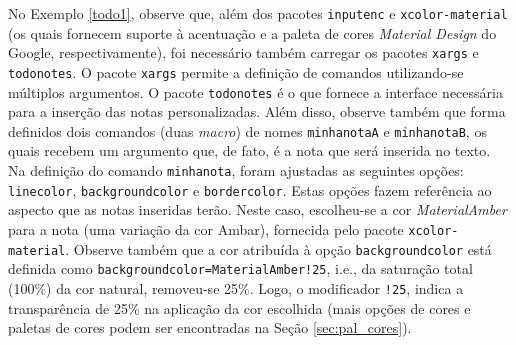 
No Exemplo \ref{todo1}, observe que, além dos pacotes {\tt inputenc} e {\tt xcolor-material} (os quais fornecem suporte à acentuação e a paleta de cores \textit{Material Design} do Google, respectivamente), foi necessário também carregar os pacotes {\tt xargs} e {\tt todonotes}. O pacote {\tt xargs} permite a definição de comandos utilizando-se múltiplos argumentos. O pacote {\tt todonotes} é o que fornece a interface necessária para a inserção das notas personalizadas. Além disso, observe também que forma definidos dois comandos (duas \textit{macro}) de nomes {\tt minhanotaA} e {\tt minhanotaB}, os quais recebem um argumento que, de fato, é a nota que será inserida no texto. Na definição do comando {\tt minhanota}, foram ajustadas as seguintes opções: {\tt linecolor}, {\tt backgroundcolor} e {\tt bordercolor}. Estas opções fazem referência ao aspecto que as notas inseridas terão. Neste caso, escolheu-se a cor \textit{MaterialAmber} para a nota (uma variação da cor Ambar), fornecida pelo pacote {\tt xcolor-material}. Observe também que a cor atribuída à opção {\tt backgroundcolor} está definida como \texttt{backgroundcolor=MaterialAmber!25}, i.e., da saturação total (100\%) da cor natural, removeu-se 25\%. Logo, o modificador {\tt !25}, indica a transparência de 25\% na aplicação da cor escolhida (mais opções de cores e paletas de cores podem ser encontradas na Seção \ref{sec:pal_cores}).

